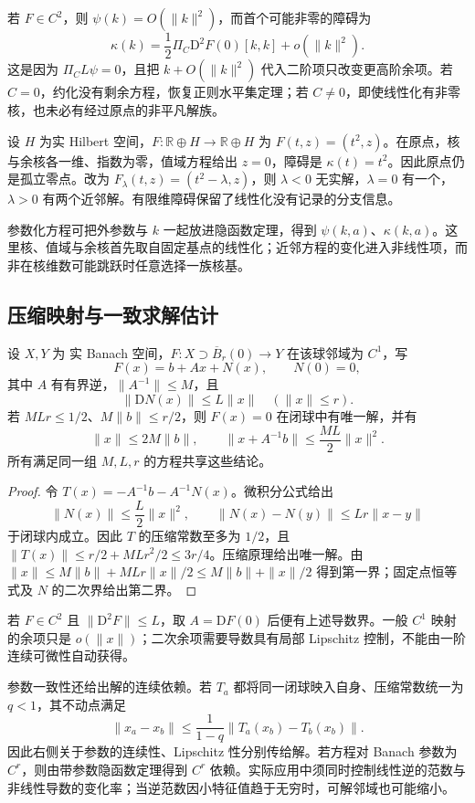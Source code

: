 若 \(F\in C^2\)，则 \(\psi(k)=O(\|k\|^2)\)，而首个可能非零的障碍为
\begin{equation}\label{g3:eq:quadratic-obstruction}
	\kappa(k)=\frac12\Pi_C\mathrm D^2F(0)[k,k]+o(\|k\|^2).
\end{equation}
这是因为 \(\Pi_CL\psi=0\)，且把 \(k+O(\|k\|^2)\) 代入二阶项只改变更高阶余项。若 \(C=0\)，约化没有剩余方程，恢复正则水平集定理；若 \(C\ne0\)，即使线性化有非零核，也未必有经过原点的非平凡解族。

\begin{example}\label{g3:exm:quadratic-obstruction-isolated}
	设 \(H\) 为实 Hilbert 空间，\(F:\mathbb R\oplus H\to\mathbb R\oplus H\) 为 \(F(t,z)=(t^2,z)\)。在原点，核与余核各一维、指数为零，值域方程给出 \(z=0\)，障碍是 \(\kappa(t)=t^2\)。因此原点仍是孤立零点。改为 \(F_\lambda(t,z)=(t^2-\lambda,z)\)，则 \(\lambda<0\) 无实解，\(\lambda=0\) 有一个，\(\lambda>0\) 有两个近邻解。有限维障碍保留了线性化没有记录的分支信息。
\end{example}

参数化方程可把外参数与 \(k\) 一起放进隐函数定理，得到 \(\psi(k,a)\)、\(\kappa(k,a)\)。这里核、值域与余核首先取自固定基点的线性化；近邻方程的变化进入非线性项，而非在核维数可能跳跃时任意选择一族核基。

\subsection{压缩映射与一致求解估计}
\label{g3:subsec:1305:06}
\begin{proposition}\label{g3:prop:uniform-quadratic-solve}
	设 \(X,Y\) 为 实 Banach 空间，\(F:X\supset\overline B_r(0)\to Y\) 在该球邻域为 \(C^1\)，写
	\[
		F(x)=b+Ax+N(x),\qquad N(0)=0,
	\]
	其中 \(A\) 有有界逆，\(\|A^{-1}\|\le M\)，且
	\[
		\|\mathrm DN(x)\|\le L\|x\|\quad(\|x\|\le r).
	\]
	若 \(MLr\le1/2\)、\(M\|b\|\le r/2\)，则 \(F(x)=0\) 在闭球中有唯一解，并有
	\[
		\|x\|\le2M\|b\|,\qquad
		\|x+A^{-1}b\|\le\frac{ML}{2}\|x\|^2.
	\]
	所有满足同一组 \(M,L,r\) 的方程共享这些结论。
\end{proposition}
\begin{proof}
	令 \(T(x)=-A^{-1}b-A^{-1}N(x)\)。微积分公式给出
	\[
		\|N(x)\|\le\frac L2\|x\|^2,\qquad
		\|N(x)-N(y)\|\le Lr\|x-y\|
	\]
	于闭球内成立。因此 \(T\) 的压缩常数至多为 \(1/2\)，且
	\(\|T(x)\|\le r/2+MLr^2/2\le3r/4\)。压缩原理给出唯一解。由
	\(\|x\|\le M\|b\|+MLr\|x\|/2\le M\|b\|+\|x\|/2\)
	得到第一界；固定点恒等式及 \(N\) 的二次界给出第二界。
\end{proof}

若 \(F\in C^2\) 且 \(\|\mathrm D^2F\|\le L\)，取 \(A=\mathrm DF(0)\) 后便有上述导数界。一般 \(C^1\) 映射的余项只是 \(o(\|x\|)\)；二次余项需要导数具有局部 Lipschitz 控制，不能由一阶连续可微性自动获得。

\ProseParagraphBreak

参数一致性还给出解的连续依赖。若 \(T_a\) 都将同一闭球映入自身、压缩常数统一为 \(q<1\)，其不动点满足
\[
	\|x_a-x_b\|\le\frac1{1-q}
	\|T_a(x_b)-T_b(x_b)\|.
\]
因此右侧关于参数的连续性、Lipschitz 性分别传给解。若方程对 Banach 参数为 \(C^r\)，则由带参数隐函数定理得到 \(C^r\) 依赖。实际应用中须同时控制线性逆的范数与非线性导数的变化率；当逆范数因小特征值趋于无穷时，可解邻域也可能缩小。
